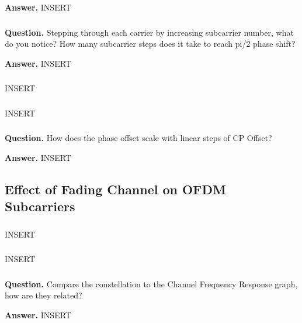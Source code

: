 \documentclass[11pt,a4paper]{article}
\begin{document}
\noindent\textbf{Answer.} INSERT

\subsubsection{ }
\noindent\textbf{Question.} Stepping through each carrier by increasing subcarrier number, what do you notice? How many subcarrier steps does it take to reach pi/2 phase shift?

\noindent\textbf{Answer.} INSERT

\subsubsection{ }
INSERT

\subsubsection{ }
INSERT

\subsubsection{ }

\noindent\textbf{Question.} How does the phase offset scale with linear steps of CP Offset?

\noindent\textbf{Answer.} INSERT

\subsection{Effect of Fading Channel on OFDM Subcarriers}

\subsubsection{ }
INSERT

\subsubsection{ }
INSERT

\subsubsection{ }
\noindent\textbf{Question.} Compare the constellation to the Channel Frequency Response graph, how are they related?

\noindent\textbf{Answer.} INSERT
\end{document}
